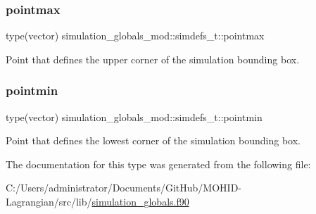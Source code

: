 \subsubsection{\texorpdfstring{pointmax}{pointmax}}
{\footnotesize\ttfamily type(vector) simulation\+\_\+globals\+\_\+mod\+::simdefs\+\_\+t\+::pointmax\hspace{0.3cm}{\ttfamily [private]}}



Point that defines the upper corner of the simulation bounding box. 

\mbox{\label{structsimulation__globals__mod_1_1simdefs__t_af3a5fb325c955840515f199c8be30aa7}} 
\subsubsection{\texorpdfstring{pointmin}{pointmin}}
{\footnotesize\ttfamily type(vector) simulation\+\_\+globals\+\_\+mod\+::simdefs\+\_\+t\+::pointmin\hspace{0.3cm}{\ttfamily [private]}}



Point that defines the lowest corner of the simulation bounding box. 



The documentation for this type was generated from the following file\+:\begin{DoxyCompactItemize}
\item 
C\+:/\+Users/administrator/\+Documents/\+Git\+Hub/\+M\+O\+H\+I\+D-\/\+Lagrangian/src/lib/\hyperlink{simulation__globals_8f90}{simulation\+\_\+globals.\+f90}\end{DoxyCompactItemize}
